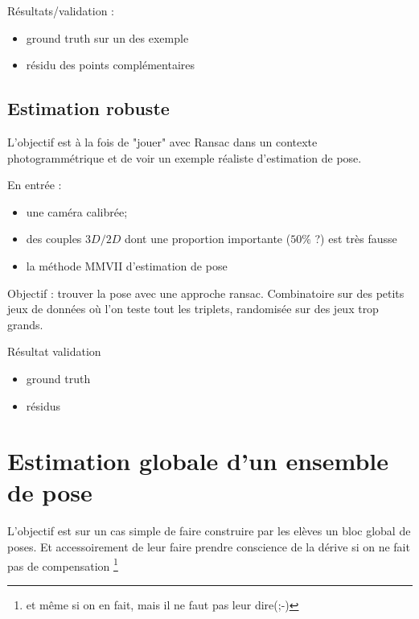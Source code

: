 Résultats/validation :


\begin{itemize}
     \item ground truth sur un des exemple
     \item résidu des points complémentaires
\end{itemize}


\subsection{Estimation robuste}

\label{TutoRansacResec}
L'objectif est à la fois de "jouer" avec Ransac dans un contexte photogrammétrique
et de voir un exemple réaliste d'estimation de pose.

En entrée :

\begin{itemize}
    \item   une caméra calibrée;
    \item   des couples $3D/2D$ dont une proportion importante ($50\%$ ?) est très fausse
    \item   la méthode MMVII d'estimation de pose
\end{itemize}

Objectif : trouver la pose avec une approche ransac.  Combinatoire sur des petits
jeux de données où l'on teste tout les triplets, randomisée sur des jeux trop grands.

Résultat validation 

\begin{itemize}
    \item   ground truth
    \item   résidus
\end{itemize}

\section{Estimation globale d'un ensemble de pose}

L'objectif est sur un cas simple de faire construire par les 
elèves un bloc global de poses.  Et accessoirement de leur faire
prendre conscience de la dérive si on ne fait pas de compensation
\footnote{et même si on en fait, mais il ne faut pas leur dire(;-)}

